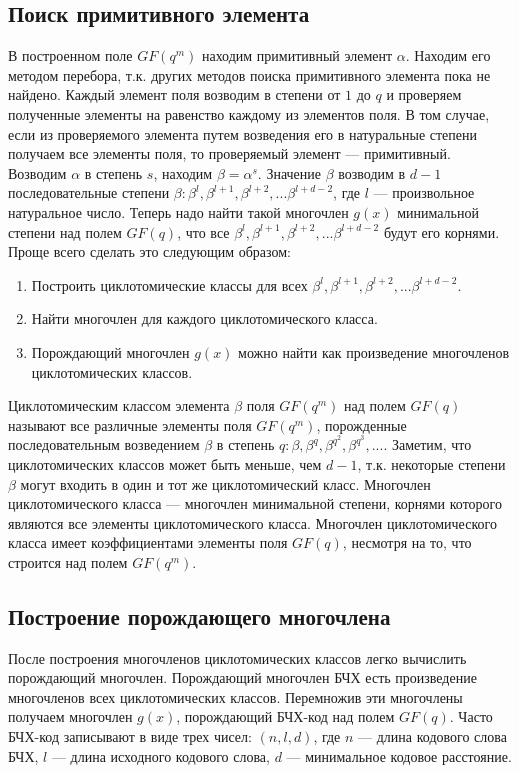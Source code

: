 \subsection{Поиск примитивного элемента}
В построенном поле $GF(q^m)$ находим примитивный элемент $\alpha$. Находим его методом перебора, т.к. других 
методов поиска примитивного элемента пока не найдено. Каждый элемент поля возводим в степени от $1$ до $q$ и 
проверяем полученные элементы на равенство каждому из элементов поля. В том случае, если из проверяемого 
элемента путем возведения его в натуральные степени получаем все элементы поля, то проверяемый элемент --- 
примитивный.
Возводим $\alpha$ в степень $s$, находим $\beta=\alpha^s$. Значение $\beta$ возводим в $d-1$ последовательные 
степени $\beta: \beta^l, \beta^{l+1}, \beta^{l+2}, ... \beta^{l+d-2}$, где $l$ --- произвольное натуральное 
число.
Теперь надо найти такой многочлен $g(x)$ минимальной степени над полем $GF(q)$, что все $\beta^l, \beta^{l+1}
, \beta^{l+2}, ... \beta^{l+d-2}$ будут его корнями. Проще всего сделать это следующим образом:
\begin{enumerate}
  \item Построить циклотомические классы для всех $\beta^l, \beta^{l+1}, \beta^{l+2}, ... \beta^{l+d-2}$.
  \item Найти многочлен для каждого циклотомического класса.
  \item Порождающий многочлен $g(x)$ можно найти как произведение многочленов циклотомических классов.
\end{enumerate}
Циклотомическим классом элемента $\beta$ поля $GF(q^m)$ над полем $GF(q)$ называют все различные элементы 
поля $GF(q^m)$, порожденные последовательным возведением $\beta$ в степень $q: \beta, \beta^q, \beta^{q^2}, 
\beta^{q^3}, ...$.
Заметим, что циклотомических классов может быть меньше, чем $d-1$, т.к. некоторые степени $\beta$ могут 
входить в один и тот же циклотомический класс. 
Многочлен циклотомического класса --- многочлен минимальной степени, корнями которого являются все элементы 
циклотомического класса. Многочлен циклотомического класса имеет коэффициентами элементы поля $GF(q)$, 
несмотря на то, что строится над полем $GF(q^m)$. 

\subsection{Построение порождающего многочлена}
После построения многочленов циклотомических классов легко вычислить порождающий многочлен. Порождающий 
многочлен БЧХ есть произведение многочленов всех циклотомических классов. Перемножив эти многочлены получаем 
многочлен $g(x)$, порождающий БЧХ-код над полем $GF(q)$. Часто БЧХ-код записывают в виде трех чисел: $(n, l, d
)$, где $n$ --- длина кодового слова БЧХ, $l$ --- длина исходного кодового слова, $d$ --- минимальное кодовое 
расстояние.

